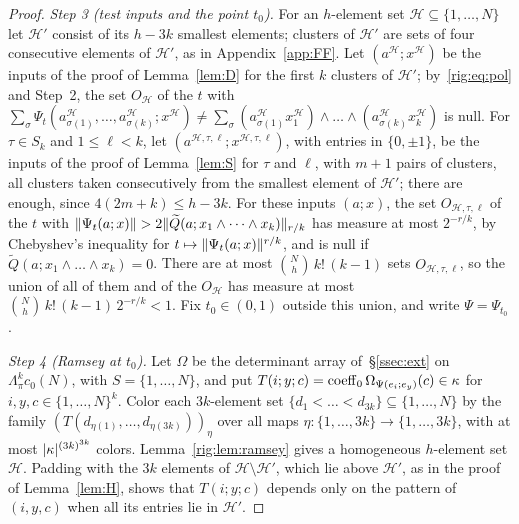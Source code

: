 \begin{proof}
\emph{Step 3 (test inputs and the point $t_0$).} For an $h$\nobreakdash-element set $\mathcal H\subseteq\{1,\dots,N\}$
let $\mathcal H'$ consist of its $h-3k$ smallest elements; clusters of $\mathcal H'$ are sets of four consecutive
elements of $\mathcal H'$, as in Appendix~\ref{app:FF}. Let $(a^{\mathcal H};x^{\mathcal H})$ be the inputs of the proof
of Lemma~\ref{lem:D} for the first $k$ clusters of $\mathcal H'$; by~\eqref{rig:eq:pol} and Step~2, the set
$O_{\mathcal H}$ of the $t$ with
$\sum_\sigma\Psi_t(a^{\mathcal H}_{\sigma(1)},\dots,a^{\mathcal H}_{\sigma(k)};x^{\mathcal H})
\ne\sum_\sigma(a^{\mathcal H}_{\sigma(1)}x^{\mathcal H}_1)\wedge\dots\wedge(a^{\mathcal H}_{\sigma(k)}x^{\mathcal H}_k)$ is
null. For $\tau\in S_k$ and $1\le\ell<k$, let $(a^{\mathcal H,\tau,\ell};x^{\mathcal H,\tau,\ell})$, with entries in
$\{0,\pm1\}$, be the inputs of the proof of Lemma~\ref{lem:S} for $\tau$ and $\ell$, with $m+1$ pairs of clusters, all
clusters taken consecutively from the smallest element of $\mathcal H'$; there are enough, since $4(2m+k)\le h-3k$. For
these inputs $(a;x)$, the set $O_{\mathcal H,\tau,\ell}$ of the $t$ with
$\lVert \Psi_t(a;x)\rVert>2\lVert \widetilde Q(a;x_1\wedge\dots\wedge x_k)\rVert_{r/k}$ has measure at most $2^{-r/k}$, by
Chebyshev's inequality for $t\mapsto\lVert \Psi_t(a;x)\rVert^{r/k}$, and is null if
$\widetilde Q(a;x_1\wedge\dots\wedge x_k)=0$. There are at most $\binom Nh\,k!\,(k-1)$ sets $O_{\mathcal H,\tau,\ell}$, so
the union of all of them and of the $O_{\mathcal H}$ has measure at most $\binom Nh\,k!\,(k-1)\,2^{-r/k}<1$. Fix
$t_0\in(0,1)$ outside this union, and write $\Psi=\Psi_{t_0}$.

\emph{Step 4 (Ramsey at $t_0$).} Let $\Omega$ be the determinant array of~\S\ref{ssec:ext} on $\Lambda^k_\pi c_0(N)$,
with $S=\{1,\dots,N\}$, and put $T(i;y;c)=\operatorname{coeff}_0\Omega_{\Psi(e_i;e_y)}(c)\in\kappa$ for $i,y,c\in\{1,\dots,N\}^k$.
Color each $3k$\nobreakdash-element set $\{d_1<\dots<d_{3k}\}\subseteq\{1,\dots,N\}$ by the family
$(T(d_{\eta(1)},\dots,d_{\eta(3k)}))_\eta$ over all maps $\eta\colon\{1,\dots,3k\}\to\{1,\dots,3k\}$, with at most
$\lvert \kappa\rvert^{(3k)^{3k}}$ colors. Lemma~\ref{rig:lem:ramsey} gives a homogeneous $h$\nobreakdash-element set
$\mathcal H$. Padding with the $3k$ elements of $\mathcal H\setminus\mathcal H'$, which lie above $\mathcal H'$, as in
the proof of Lemma~\ref{lem:H}, shows that $T(i;y;c)$ depends only on the pattern of $(i,y,c)$ when all its entries lie
in $\mathcal H'$.


\end{proof}
